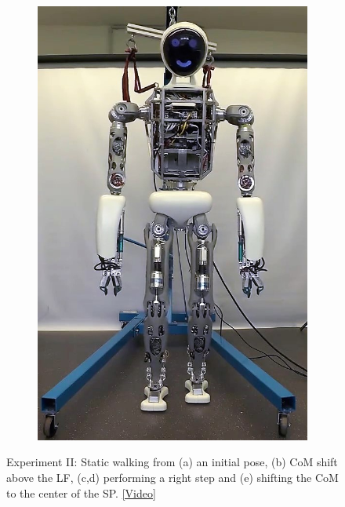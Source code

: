 \begin{figure}[h!]
\begin{subfigure}{.2\textwidth}
	\includegraphics[width=.95\linewidth]{experiments/walkStatic/snaps/5}
	\caption{}
	\end{subfigure}%
\caption[Experiment II: Static walking]{Experiment II: Static walking from (a) an initial pose, (b) \gls{CoM} shift above the \gls{LF}, (c,d) performing a right step and (e) shifting the \gls{CoM} to the center of the \gls{SP}. \href{https://github.com/julesser/ma-thesis-experimental-results/tree/master/walkStatic/walkStatic.mp4}{[Video]}}
\label{exp:staticWalkingSnaps}
\end{figure} 

